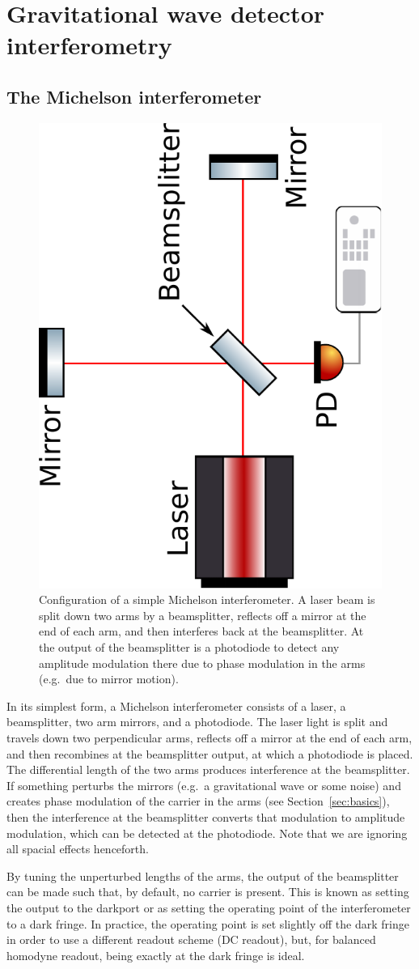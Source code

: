 \documentclass[aps,pra,superscriptaddress,reprint,nofootinbib]{revtex4-1}
\begin{document}
\section{Gravitational wave detector interferometry}
\label{sec:gwIFO}

\subsection{The Michelson interferometer}

\begin{figure}[ht]
	\begin{center}
	\includegraphics[height=0.35\textwidth, angle=-90]{figures/Michelson_interferometer.pdf}
	\end{center}
	\caption{Configuration of a simple Michelson interferometer. A laser beam is split down two arms by a beamsplitter, reflects off a mirror at the end of each arm, and then interferes back at the beamsplitter. At the output of the beamsplitter is a photodiode to detect any amplitude modulation there due to phase modulation in the arms (e.g.\ due to mirror motion).}
	\label{fig:Michelson}
\end{figure}

In its simplest form, a Michelson interferometer consists of a laser, a beamsplitter, two arm mirrors, and a photodiode. The laser light is split and travels down two perpendicular arms, reflects off a mirror at the end of each arm, and then recombines at the beamsplitter output, at which a photodiode is placed. The differential length of the two arms produces interference at the beamsplitter.
If something perturbs the mirrors (e.g.\ a gravitational wave or some noise) and creates phase modulation of the carrier in the arms (see Section~\ref{sec:basics}), then the interference at the beamsplitter converts that modulation to amplitude modulation, which can be detected at the photodiode.
Note that we are ignoring all spacial effects henceforth.


By tuning the unperturbed lengths of the arms, the output of the beamsplitter can be made such that, by default, no carrier is present. This is known as setting the output to the darkport or as setting the operating point of the interferometer to a dark fringe. In practice, the operating point is set slightly off the dark fringe in order to use a different readout scheme (DC readout), but, for balanced homodyne readout, being exactly at the dark fringe is ideal.
\end{document}
